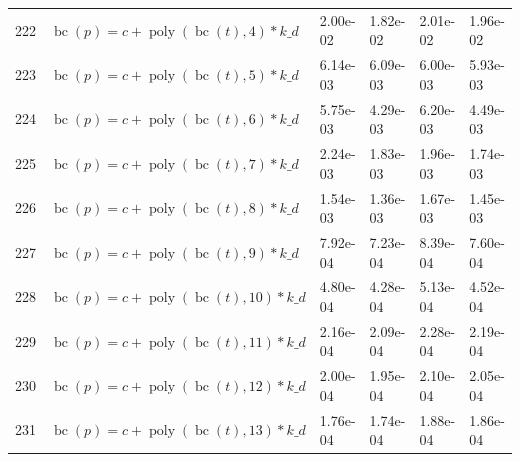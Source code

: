 \documentclass[12pt,a4paper]{article}
\DeclareMathOperator{\bc}{bc}
\DeclareMathOperator{\poly}{poly}
\begin{document}
\begin{longtable}[t]{ll>{\raggedleft\arraybackslash}p{2cm}>{\raggedleft\arraybackslash}p{2cm}>{\raggedleft\arraybackslash}p{2cm}>{\raggedleft\arraybackslash}p{2cm}}
222 & $\bc(p) = c + \poly\left( \bc(t), 4 \right) * k\_d$ & 2.00e-02 & 1.82e-02 & 2.01e-02 & 1.96e-02\\
\rowcolor{gray!6}  223 & $\bc(p) = c + \poly\left( \bc(t), 5 \right) * k\_d$ & 6.14e-03 & 6.09e-03 & 6.00e-03 & 5.93e-03\\
224 & $\bc(p) = c + \poly\left( \bc(t), 6 \right) * k\_d$ & 5.75e-03 & 4.29e-03 & 6.20e-03 & 4.49e-03\\
\rowcolor{gray!6}  225 & $\bc(p) = c + \poly\left( \bc(t), 7 \right) * k\_d$ & 2.24e-03 & 1.83e-03 & 1.96e-03 & 1.74e-03\\
226 & $\bc(p) = c + \poly\left( \bc(t), 8 \right) * k\_d$ & 1.54e-03 & 1.36e-03 & 1.67e-03 & 1.45e-03\\
\rowcolor{gray!6}  227 & $\bc(p) = c + \poly\left( \bc(t), 9 \right) * k\_d$ & 7.92e-04 & 7.23e-04 & 8.39e-04 & 7.60e-04\\
228 & $\bc(p) = c + \poly\left( \bc(t), 10 \right) * k\_d$ & 4.80e-04 & 4.28e-04 & 5.13e-04 & 4.52e-04\\
\rowcolor{gray!6}  229 & $\bc(p) = c + \poly\left( \bc(t), 11 \right) * k\_d$ & 2.16e-04 & 2.09e-04 & 2.28e-04 & 2.19e-04\\
230 & $\bc(p) = c + \poly\left( \bc(t), 12 \right) * k\_d$ & 2.00e-04 & 1.95e-04 & 2.10e-04 & 2.05e-04\\
\rowcolor{gray!6}  231 & $\bc(p) = c + \poly\left( \bc(t), 13 \right) * k\_d$ & 1.76e-04 & 1.74e-04 & 1.88e-04 & 1.86e-04\\*
\end{longtable}
\endgroup{}
\end{document}
